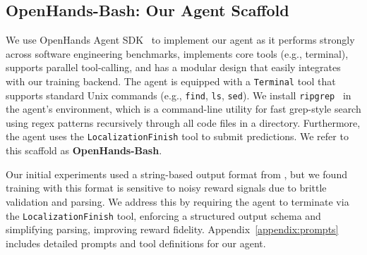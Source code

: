 \subsection{OpenHands-Bash: Our Agent Scaffold}\label{sec:agent_scaffold}

We use OpenHands Agent SDK~\citep{wang2025openhandssoftwareagentsdk} to implement our agent as it performs strongly across software engineering benchmarks, implements core tools (e.g., terminal), supports parallel tool-calling, and has a modular design that easily integrates with our training backend. The agent is equipped with a \texttt{Terminal} tool that supports standard Unix commands (e.g., \texttt{find}, \texttt{ls}, \texttt{sed}). We install \texttt{ripgrep}~\citep{ripgrep} in the agent's environment, which is a command-line utility for fast grep-style search using regex patterns recursively through all code files in a directory. Furthermore, the agent uses the \texttt{LocalizationFinish} tool to submit predictions. We refer to this scaffold as \textbf{OpenHands-Bash}.

Our initial experiments used a string-based output format from \citet{chen-etal-2025-locagent}, but we found training with this format is sensitive to noisy reward signals due to brittle validation and parsing. We address this by requiring the agent to terminate via the \texttt{LocalizationFinish} tool, enforcing a structured output schema and simplifying parsing, improving reward fidelity. Appendix~\ref{appendix:prompts} includes detailed prompts and tool definitions for our agent.


